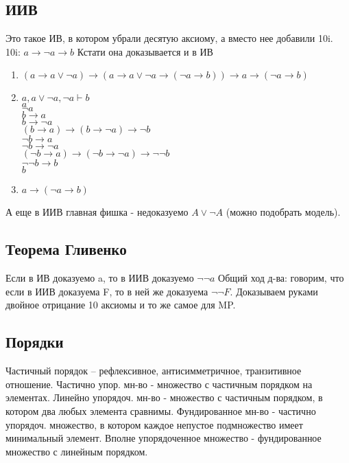 \documentclass[12pt]{article}
\begin{document}
\subsection{ИИВ}
\label{sec-2-5}
Это такое ИВ, в котором убрали десятую аксиому, а вместо нее
добавили 10i.
10i: $a \to \lnot a \to b$
Кстати она доказывается и в ИВ
\begin{enumerate}
\item $(a \to a\lor \lnot a) \to (a \to a\lor \lnot a \to (\lnot a \to b)) \to a \to (\lnot a \to b)$
\item $a, a\lor \lnot a, \lnot a \vdash b$\\
$a$\\
$\lnot a$\\
$b \to a$\\
$b \to \lnot a$\\
$(b \to a) \to (b \to \lnot a) \to \lnot b$\\
$\lnot b \to a$\\
$\lnot b \to \lnot a$\\
$(\lnot b \to a) \to (\lnot b \to \lnot a) \to \lnot \lnot b$\\
$\lnot \lnot b \to b$\\
$b$\\
\item $a \to (\lnot a \to b)$
\end{enumerate}
А еще в ИИВ главная фишка - недоказуемо $A \lor \lnot A$ (можно подобрать модель).
\subsection{Теорема Гливенко}
\label{sec-2-6}
Если в ИВ доказуемо a, то в ИИВ доказуемо $\lnot \lnot a$
Общий ход д-ва: говорим, что если в ИИВ доказуема F,
то в ней же доказуема $\lnot \lnot F$. Доказываем руками двойное
отрицание 10 аксиомы и то же самое для MP.
\subsection{Порядки}
\label{sec-2-7}
Частичный порядок – рефлексивное, антисимметричное, транзитивное
отношение.
Частично упор. мн-во - множество с частичным порядком на элементах.
Линейно упорядоч. мн-во - множество с частичным порядком, в котором
два любых элемента сравнимы.
Фундированное мн-во - частично упорядоч. множество, в котором каждое
непустое подмножество имеет минимальный элемент.
Вполне упорядоченное множество - фундированное множество с линейным
порядком.
\end{document}
